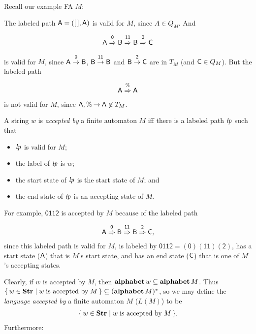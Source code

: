 Recall our example FA $M$:
\begin{center}

\end{center}
The labeled path $\mathsf{A}=([\,],\mathsf{A})$ is valid for $M$,
since $A\in Q_M$.  And
\begin{gather*}
\mathsf{A}\stackrel{\strut\mathsf{0}}{\Rightarrow}\mathsf{B}\stackrel{\strut\mathsf{11}}{\Rightarrow}\mathsf{B}\stackrel{\strut\mathsf{2}}{\Rightarrow}\mathsf{C}
\end{gather*}
is valid for $M$, since $\mathsf{A}\stackrel{\strut\mathsf{0}}{\rightarrow}\mathsf{B}$,
$\mathsf{B}\stackrel{\strut\mathsf{11}}{\rightarrow}\mathsf{B}$ and $\mathsf{B}\stackrel{\strut\mathsf{2}}{\rightarrow}\mathsf{C}$ are in
$T_M$ (and $\mathsf{C}\in Q_M$). But the labeled path
\begin{gather*}
\mathsf{A}\stackrel{\strut\%}{\Rightarrow}\mathsf{A}
\end{gather*}
is not valid for $M$, since $\mathsf{A},\%\mathbin{\to}\mathsf{A}\not\in T_M$.

%
A string $w$ is \emph{accepted by} a finite automaton $M$ iff
there is a labeled path ${\it lp}$ such that
\begin{itemize}
\item ${\it lp}$ is valid for $M$;

\item the label of ${\it lp}$ is $w$;

\item the start state of ${\it lp}$ is the start state of $M$; and

\item the end state of ${\it lp}$ is an accepting state of $M$.
\end{itemize}
For example, $\mathsf{0112}$ is accepted by
$M$ because of the labeled path
\begin{gather*}
\mathsf{A}\stackrel{\strut\mathsf{0}}{\Rightarrow}\mathsf{B}\stackrel{\strut\mathsf{11}}{\Rightarrow}\mathsf{B}\stackrel{\strut\mathsf{2}}{\Rightarrow}\mathsf{C} ,
\end{gather*}
since this labeled path is valid for $M$, is labeled by $\mathsf{0112} =
\mathsf{(0)(11)(2)}$, has a start state ($\mathsf{A}$) that is $M$'s start state,
and has an end state ($\mathsf{C}$) that is one of $M$'s accepting states.

%
%
%
Clearly, if $w$ is accepted by $M$, then
$\mathbf{alphabet}\,w\subseteq\mathbf{alphabet}\,M$.  Thus $\{ \, w\in\mathbf{Str} \mid w\;\allowbreak\mbox{is
    accepted by}\allowbreak\;M \, \}\subseteq(\mathbf{alphabet}\,M)^*$, so we may define the
\emph{language accepted by} a finite automaton $M$ ($L(M)$) to be
\begin{gather*}
\{ \, w\in\mathbf{Str} \mid w\;\allowbreak\mbox{is accepted by}\allowbreak\;M \, \}.
\end{gather*}
Furthermore:

